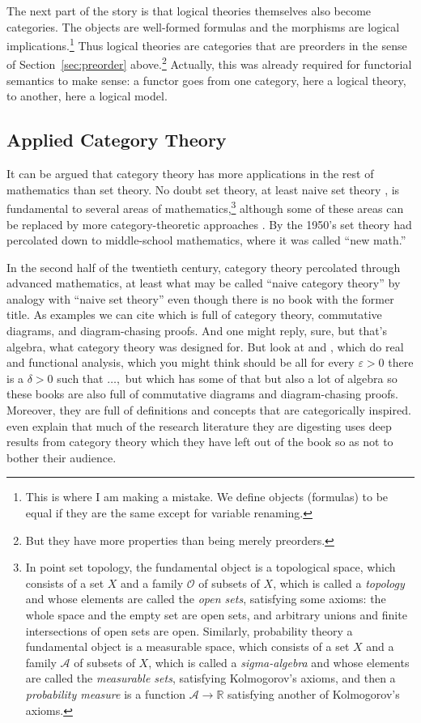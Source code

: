 \documentclass[11pt]{article}
\newcommand{\real}{\mathbb{R}}
\begin{document}
The next part of the story is that logical theories themselves also
become categories.  The objects are well-formed formulas and the morphisms
are logical implications.\footnote{This is where I am making a mistake.
We define objects (formulas) to be equal if they are the same except for
variable renaming.}  Thus logical theories are categories that are preorders
in the sense of Section~\ref{sec:preorder} above.\footnote{But they have
more properties than being merely preorders.}
Actually, this was already required for functorial semantics to make sense:
a functor goes from one category, here a logical theory, to another,
here a logical model.

\subsection{Applied Category Theory}

It can be argued that category theory has more applications in the rest
of mathematics than set theory.  No doubt set theory, at least naive
set theory \citep{halmos}, is fundamental to several areas of
mathematics,\footnote{
In point set topology, the fundamental object is a topological space, which
consists of a set $X$ and a family $\mathcal{O}$ of subsets of $X$,
which is called a \emph{topology} and whose elements
are called the \emph{open sets}, satisfying some axioms: the whole space
and the empty set are open sets, and arbitrary unions and finite intersections
of open sets are open.  Similarly, probability theory a fundamental object
is a measurable space, which
consists of a set $X$ and a family $\mathcal{A}$ of subsets of $X$,
which is called a \emph{sigma-algebra} and whose elements
are called the \emph{measurable sets}, satisfying Kolmogorov's axioms,
and then a \emph{probability measure} is a function $\mathcal{A} \to \real$
satisfying another of Kolmogorov's axioms.}
although some of these areas can be replaced by more category-theoretic
approaches \citep{johnstone}.
By the 1950's set theory had percolated down to middle-school mathematics,
where it was called ``new math.''

In the second half of the twentieth century, category theory percolated
through advanced mathematics, at least what may be called ``naive category
theory'' by analogy with ``naive set theory'' even though there is no book
with the former title.  As examples we can cite \citet{aluffi} which is
full of category theory, commutative diagrams, and diagram-chasing proofs.
And one might reply, sure, but that's algebra, what category theory was
designed for.  But look at \citet{lang} and \citet{beattie-butzmann}, which
do real and functional analysis, which you might think should be all
for every $\varepsilon > 0$ there is a $\delta > 0$ such that $\ldots,$
but which has some of that but also a lot of algebra so these books are
also full of commutative diagrams and diagram-chasing proofs.
Moreover, they are full of definitions and concepts that are categorically
inspired.  \citet[Preface]{beattie-butzmann} even explain that much of the
research literature they are digesting uses deep results from category theory
which they have left out of the book so as not to bother their audience.
\end{document}
